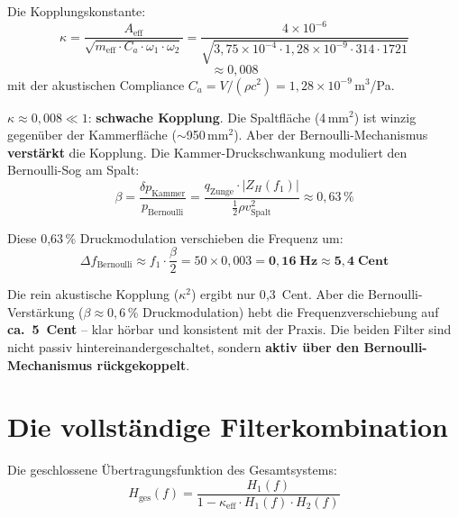 \documentclass[11pt,a4paper]{article}
\begin{document}
Die Kopplungskonstante:
\begin{equation}
\kappa = \frac{A_\text{eff}}{\sqrt{m_\text{eff} \cdot C_a \cdot \omega_1 \cdot \omega_2}}
       = \frac{4 \times 10^{-6}}{\sqrt{3{,}75 \times 10^{-4} \cdot 1{,}28 \times 10^{-9} \cdot 314 \cdot 1721}}
\end{equation}
\begin{equation*}
       \approx 0{,}008
\end{equation*}
mit der akustischen Compliance $C_a = V / (\rho c^2) = 1{,}28 \times 10^{-9}$\,m$^3$/Pa.

$\kappa \approx 0{,}008 \ll 1$: \textbf{schwache Kopplung}. Die Spaltfläche (4\,mm$^2$) ist winzig gegenüber der Kammerfläche ($\sim$950\,mm$^2$). Aber der Bernoulli-Mechanismus \textbf{verstärkt} die Kopplung. Die Kammer-Druckschwankung moduliert den Bernoulli-Sog am Spalt:
\begin{equation}
\beta = \frac{\delta p_\text{Kammer}}{p_\text{Bernoulli}} = \frac{q_\text{Zunge} \cdot |Z_H(f_1)|}{\frac{1}{2}\rho v_\text{Spalt}^2} \approx 0{,}63\,\%
\end{equation}

Diese 0{,}63\,\% Druckmodulation verschieben die Frequenz um:
\begin{equation}
\Delta f_\text{Bernoulli} \approx f_1 \cdot \frac{\beta}{2} = 50 \times 0{,}003 = \mathbf{0{,}16\;\text{Hz} \approx 5{,}4\;\text{Cent}}
\end{equation}

\begin{keybox}
Die rein akustische Kopplung ($\kappa^2$) ergibt nur 0{,}3~Cent. Aber die Bernoulli-Verstärkung ($\beta \approx 0{,}6\,\%$ Druckmodulation) hebt die Frequenzverschiebung auf \textbf{ca.~5~Cent} -- klar hörbar und konsistent mit der Praxis. Die beiden Filter sind nicht passiv hintereinandergeschaltet, sondern \textbf{aktiv über den Bernoulli-Mechanismus rückgekoppelt}.
\end{keybox}

\section{Die vollständige Filterkombination}

Die geschlossene Übertragungsfunktion des Gesamtsystems:
\begin{equation}
\boxed{H_\text{ges}(f) = \frac{H_1(f)}{1 - \kappa_\text{eff} \cdot H_1(f) \cdot H_2(f)}}
\end{equation}
\end{document}
